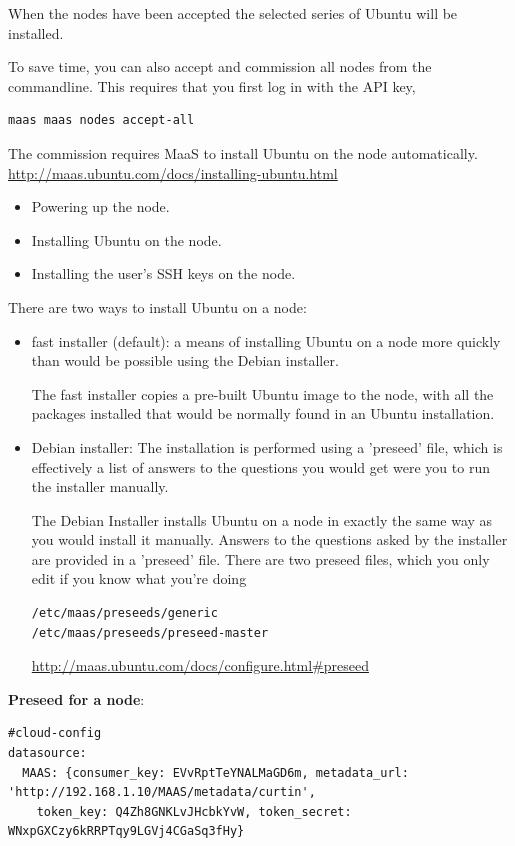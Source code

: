 When the nodes have been accepted the selected series of Ubuntu will be
installed.

To save time, you can also accept and commission all nodes from the commandline.
This requires that you first log in with the API key,
\begin{verbatim}
maas maas nodes accept-all
\end{verbatim}


The commission requires MaaS to install Ubuntu on the node automatically.
\url{http://maas.ubuntu.com/docs/installing-ubuntu.html}
\begin{itemize}
  \item Powering up the node.
  \item Installing Ubuntu on the node.
  \item Installing the user's SSH keys on the node.
\end{itemize}

There are two ways to install Ubuntu on a node:
\begin{itemize}
  \item fast installer (default): a means of installing Ubuntu on a node more
  quickly than would be possible using the Debian installer.

  The fast installer copies a pre-built Ubuntu image to the node, with all the
  packages installed that would be normally found in an Ubuntu installation.
  
  \item Debian installer:  The installation is performed using a 'preseed' file,
  which is effectively a list of answers to the questions you would get were you
  to run the installer manually.
  
  
  The Debian Installer installs Ubuntu on a node in exactly the same way as you
  would install it manually. Answers to the questions asked by the installer are
  provided in a 'preseed' file. There are two preseed files, which you only edit
  if you know what you're doing
\begin{verbatim}
/etc/maas/preseeds/generic
/etc/maas/preseeds/preseed-master
\end{verbatim}  
\url{http://maas.ubuntu.com/docs/configure.html\#preseed}


 
\end{itemize}

{\bf Preseed for a node}:
\begin{verbatim}
#cloud-config
datasource:
  MAAS: {consumer_key: EVvRptTeYNALMaGD6m, metadata_url: 'http://192.168.1.10/MAAS/metadata/curtin',
    token_key: Q4Zh8GNKLvJHcbkYvW, token_secret: WNxpGXCzy6kRRPTqy9LGVj4CGaSq3fHy}
\end{verbatim}

